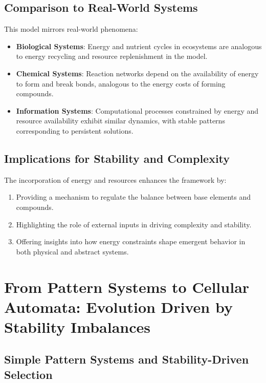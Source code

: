 \documentclass[entropy,article,submit,pdftex,moreauthors]{Definitions/mdpi}
\begin{document}
\subsection{Comparison to Real-World Systems}

This model mirrors real-world phenomena:
\begin{itemize}
    \item \textbf{Biological Systems}: Energy and nutrient cycles in ecosystems are analogous to energy recycling and resource replenishment in the model.
    \item \textbf{Chemical Systems}: Reaction networks depend on the availability of energy to form and break bonds, analogous to the energy costs of forming compounds.
    \item \textbf{Information Systems}: Computational processes constrained by energy and resource availability exhibit similar dynamics, with stable patterns corresponding to persistent solutions.
\end{itemize}

\subsection{Implications for Stability and Complexity}

The incorporation of energy and resources enhances the framework by:
\begin{enumerate}
    \item Providing a mechanism to regulate the balance between base elements and compounds.
    \item Highlighting the role of external inputs in driving complexity and stability.
    \item Offering insights into how energy constraints shape emergent behavior in both physical and abstract systems.
\end{enumerate}

\section{From Pattern Systems to Cellular Automata: Evolution Driven by Stability Imbalances}

\subsection{Simple Pattern Systems and Stability-Driven Selection}
\end{document}
